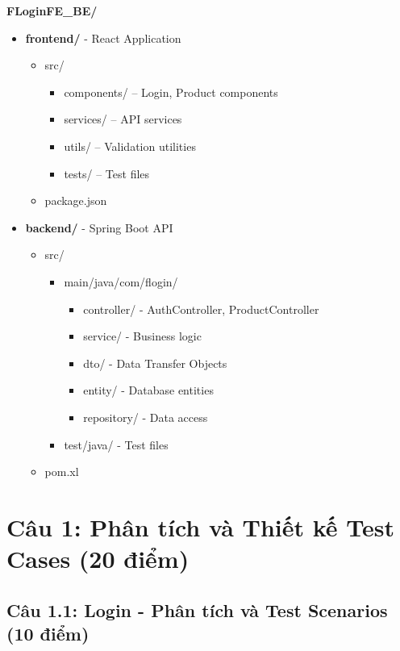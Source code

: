 \documentclass[a4paper,12pt]{article}
\begin{document}
\textbf{FLoginFE\_BE/}
\begin{itemize}
    \item \textbf{frontend/} - React Application
    \begin{itemize}
        \item{src/}
        \begin{itemize}
            \item components/ -- Login, Product components
            \item services/ -- API services
            \item utils/ -- Validation utilities
            \item tests/ -- Test files
        \end{itemize}
        \item{package.json}
    \end{itemize}

    \item \textbf{backend/} - Spring Boot API
    \begin{itemize}
        \item{src/}
        \begin{itemize}
            \item  main/java/com/flogin/
            \begin{itemize}
                \item controller/ - AuthController, ProductController
                \item service/ - Business logic
                \item dto/ - Data Transfer Objects
                \item entity/ - Database entities
                \item repository/ - Data access
            \end{itemize}
            \item test/java/ - Test files
        \end{itemize}
        \item{pom.xl}
    \end{itemize}
\end{itemize}
\clearpage

\section{Câu 1: Phân tích và Thiết kế Test Cases (20 điểm)}

\subsection{Câu 1.1: Login - Phân tích và Test Scenarios (10 điểm)}
\end{document}
